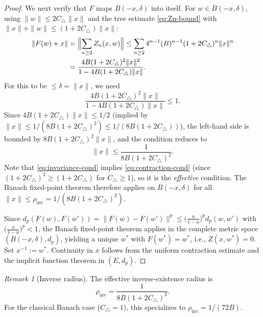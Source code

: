 \documentclass[10pt]{amsart}
\theoremstyle{definition}
\theoremstyle{remark}
\newtheorem{remark}[theorem]{Remark}
\numberwithin{equation}{section}
\newcommand{\Ctri}{C_{\triangle}}    %
\newcommand{\Cbracket}{B}            %
\begin{document}
\begin{proof}
We next verify that $F$ maps $\overline{B}(-x,\delta)$ into itself.
For $w\in \overline{B}(-x,\delta)$, using $\|w\|\le 2\Ctri\|x\|$ and the tree
estimate \eqref{eq:Zn-bound} with $\|x\|+\|w\|\le (1+2\Ctri)\|x\|$:
\begin{align*}
  \|F(w)+x\| &= \Bigl\|\sum_{n\ge 2}Z_n(x,w)\Bigr\|
  \le \sum_{n\ge 2}4^{n-1}(\Cbracket)^{n-1}(1+2\Ctri)^n\|x\|^n \\
  &= \frac{4\Cbracket(1+2\Ctri)^2\|x\|^2}{1-4\Cbracket(1+2\Ctri)\|x\|}.
\end{align*}
For this to be $\le \delta = \|x\|$, we need
\[
  \frac{4\Cbracket(1+2\Ctri)^2\|x\|}{1-4\Cbracket(1+2\Ctri)\|x\|} \le 1.
\]
Since $4\Cbracket(1+2\Ctri)\|x\| \le 1/2$ (implied by
$\|x\| \le 1/(8\Cbracket(1+2\Ctri)^2) \le 1/(8\Cbracket(1+2\Ctri))$), the left-hand
side is bounded by $8\Cbracket(1+2\Ctri)^2\|x\|$, and the condition reduces to
\begin{equation}\label{eq:invariance-cond}
  \|x\| \le \frac{1}{8\Cbracket(1+2\Ctri)^2}.
\end{equation}
Note that \eqref{eq:invariance-cond} implies \eqref{eq:contraction-cond} (since
$(1+2\Ctri)^2 \ge (1+2\Ctri)$ for $\Ctri \ge 1$), so it is the \emph{effective} condition.
The Banach fixed-point theorem therefore applies on $\overline{B}(-x,\delta)$ for all
$\|x\| \le \rho_{\mathrm{inv}} = 1/(8\Cbracket(1+2\Ctri)^2)$.

Since $d_p(F(w),F(w')) = \|F(w)-F(w')\|^p \le \bigl(\tfrac{u}{1-u}\bigr)^p d_p(w,w')$
with $\bigl(\tfrac{u}{1-u}\bigr)^p < 1$, the Banach fixed-point theorem applies in the
complete metric space $(\overline{B}(-x,\delta), d_p)$, yielding a unique $w^*$ with
$F(w^*) = w^*$, i.e., $Z(x,w^*)=0$.  Set $x^{-1}:=w^*$.  Continuity in $x$ follows
from the uniform contraction estimate and the implicit function theorem in $(E,d_p)$.
\end{proof}



\begin{remark}[Inverse radius]
The effective inverse-existence radius is
\[
  \rho_{\mathrm{inv}} = \frac{1}{8\Cbracket(1+2\Ctri)^2}.
\]
For the classical Banach case ($\Ctri=1$), this specializes to
$\rho_{\mathrm{inv}} = 1/(72\Cbracket)$.
\end{remark}
\end{document}
